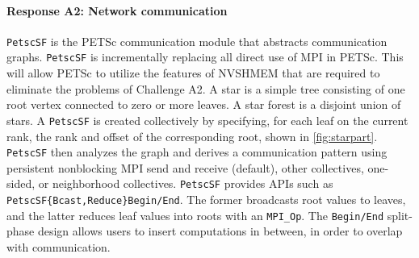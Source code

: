 \documentclass[10pt,journal,compsoc]{IEEEtran}
\begin{document}
\paragraph{Response A2: Network communication } 
\label{subsec:challengeMPIGPUSF}

\texttt{PetscSF} is the PETSc communication module that abstracts communication graphs. 
{\tt PetscSF} is incrementally replacing all direct use of MPI in PETSc.  This will allow PETSc to utilize the features of NVSHMEM that are required
to eliminate the problems of Challenge A2. A star is a simple tree consisting of one root vertex connected to zero or more leaves. A star forest is a disjoint union of stars. 
 A \texttt{PetscSF} is created collectively by specifying, for each leaf on the current rank, the rank and offset of the corresponding root, shown in \autoref{fig:starpart}. {\tt PetscSF} then analyzes the graph and derives a communication pattern  using persistent nonblocking MPI send and receive (default), other collectives, one-sided, or neighborhood collectives. {\tt PetscSF} provides APIs such as \texttt{PetscSF\{Bcast,Reduce\}Begin/End}. The former
broadcasts root values to leaves, and the latter reduces leaf values into roots with an   
\texttt{MPI\_Op}. The \texttt{Begin/End} split-phase design allows users to
insert computations in between, in order to overlap with communication.
\end{document}
